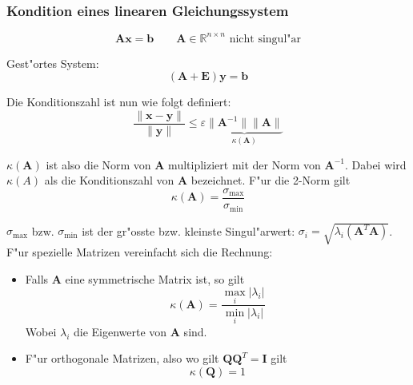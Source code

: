 \documentclass[german, 10pt, a4paper, twocolumn]{scrartcl}
\theoremstyle{definition}
\begin{document}
\subsubsection{Kondition eines linearen Gleichungssystem}

\begin{displaymath}
	\mathbf{A} \mathbf{x} = \mathbf{b} \qquad \mathbf{A} \in \mathbb{R}^{n\times n} \mbox{ nicht singul"ar}
\end{displaymath}

Gest"ortes System:
\begin{displaymath}
	(\mathbf{A} + \mathbf{E}) \mathbf{y} = \mathbf{b}
\end{displaymath}

Die Konditionszahl ist nun wie folgt definiert:
\begin{displaymath}
	\frac{\parallel \mathbf{x} - \mathbf{y} \parallel}{ \parallel \mathbf{y} \parallel} \leq \varepsilon \underbrace{\parallel \mathbf{A}^{-1} \parallel \parallel \mathbf{A} \parallel}_{\kappa(\mathbf{A})}
\end{displaymath}

$\kappa(\mathbf{A})$ ist also die Norm von $\mathbf{A}$ multipliziert mit der Norm von $\mathbf{A}^{-1}$. Dabei wird $\kappa(A)$ als die Konditionszahl von $\mathbf{A}$ bezeichnet. F"ur die 2-Norm gilt
\begin{displaymath}
	\kappa(\mathbf{A}) = \frac{\sigma_{\max}}{\sigma_{\min}}
\end{displaymath}

$\sigma_{\max}$ bzw. $\sigma_{\min}$ ist der gr"osste bzw. kleinste Singul"arwert: $\sigma_i = \sqrt{\lambda_i (\mathbf{A}^T \mathbf{A})}$.\\

F"ur spezielle Matrizen vereinfacht sich die Rechnung:
\begin{itemize}
	\item Falls $\mathbf{A}$ eine symmetrische Matrix ist, so gilt
		\begin{displaymath}
			\kappa(\mathbf{A}) = \frac{\max_i |\lambda_i|}{\min_i |\lambda_i|}
		\end{displaymath}
		Wobei $\lambda_i$ die Eigenwerte von $\mathbf{A}$ sind.
	\item F"ur orthogonale Matrizen, also wo gilt $\mathbf{Q} \mathbf{Q}^T = \mathbf{I}$ gilt
		\begin{displaymath}
			\kappa(\mathbf{Q}) = 1
		\end{displaymath}
\end{itemize}
\end{document}
